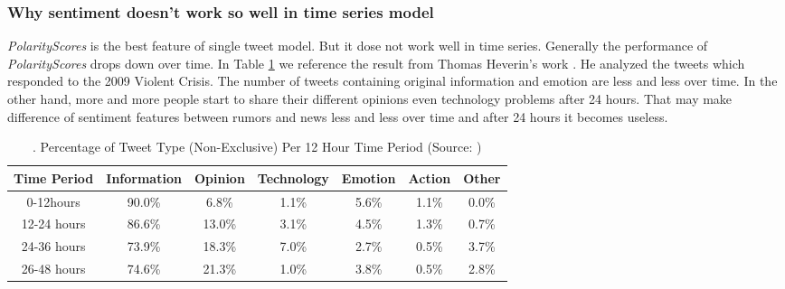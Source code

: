 \subsubsection{Why sentiment doesn't work so well in time series model}
 \emph{PolarityScores} is the best feature of single tweet model. But it dose not work well in time series. Generally   the performance of \emph{PolarityScores} drops down over time. 
  In Table \ref{Percentage-of-tweet-type} we reference the result from Thomas Heverin's work \cite{heverin2010microblogging}. He analyzed the tweets which responded to the 2009 Violent Crisis. The number of tweets containing original information and emotion are less and less over time. In the other hand, more and more people start to share their different opinions even technology problems after 24 hours. That may make difference of sentiment features between rumors and news less and less over time and after 24 hours it becomes useless. 
\begin{table}[!h]
\centering
\begin{tabular}{ccccccc}
\hline

\multicolumn{1}{|c|}{\small{Time Period}} & \multicolumn{1}{c|}{\small{Information}} & \multicolumn{1}{c|}{\small{Opinion}} & \multicolumn{1}{c|}{\small{Technology}} & \multicolumn{1}{c|}{\small{Emotion}} & \multicolumn{1}{c|}{\small{Action}} & \multicolumn{1}{c|}{\small{Other}} \\ \hline
\multicolumn{1}{|c|}{\small{0-12hours}}   & \multicolumn{1}{c|}{90.0\%}           & \multicolumn{1}{c|}{6.8\%}        & \multicolumn{1}{c|}{1.1\%}           & \multicolumn{1}{c|}{5.6\%}        & \multicolumn{1}{c|}{1.1\%}       & \multicolumn{1}{c|}{0.0\%}      \\ \hline
\multicolumn{1}{|c|}{\small{12-24 hours}} & \multicolumn{1}{c|}{86.6\%}           & \multicolumn{1}{c|}{13.0\%}       & \multicolumn{1}{c|}{3.1\%}           & \multicolumn{1}{c|}{4.5\%}        & \multicolumn{1}{c|}{1.3\%}       & \multicolumn{1}{c|}{0.7\%}      \\ \hline
\multicolumn{1}{|c|}{\small{24-36 hours}} & \multicolumn{1}{c|}{73.9\%}           & \multicolumn{1}{c|}{18.3\%}       & \multicolumn{1}{c|}{7.0\%}           & \multicolumn{1}{c|}{2.7\%}        & \multicolumn{1}{c|}{0.5\%}       & \multicolumn{1}{c|}{3.7\%}      \\ \hline
\multicolumn{1}{|c|}{\small{26-48 hours}} & \multicolumn{1}{c|}{74.6\%}           & \multicolumn{1}{c|}{21.3\%}       & \multicolumn{1}{c|}{1.0\%}           & \multicolumn{1}{c|}{3.8\%}        & \multicolumn{1}{c|}{0.5\%}       & \multicolumn{1}{c|}{2.8\%}      \\ \hline

\end{tabular}
   \caption{. Percentage of Tweet Type (Non-Exclusive) Per 12 Hour Time Period (Source: \cite{heverin2010microblogging})}
\label{Percentage-of-tweet-type}

\end{table}


